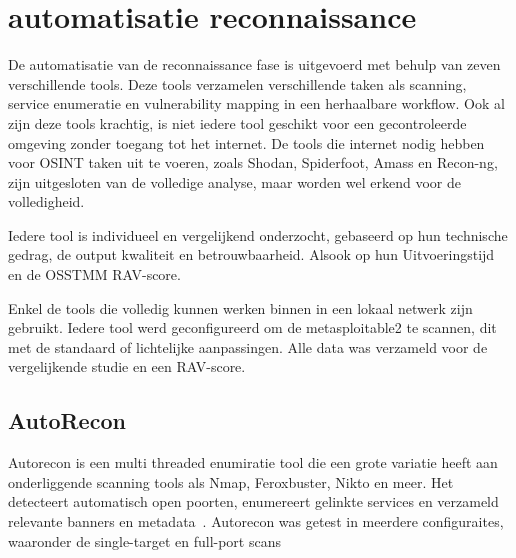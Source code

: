 \section{automatisatie reconnaissance}

De automatisatie van de reconnaissance fase is uitgevoerd met behulp van zeven verschillende tools.
Deze tools verzamelen verschillende taken als scanning, service enumeratie en vulnerability mapping in een herhaalbare workflow.
Ook al zijn deze tools krachtig, is niet iedere tool geschikt voor een gecontroleerde omgeving zonder toegang tot het internet.
De tools die internet nodig hebben voor OSINT taken uit te voeren, zoals Shodan, Spiderfoot, Amass en Recon-ng, zijn uitgesloten van de volledige analyse, maar worden wel erkend voor de volledigheid.

Iedere tool is individueel en vergelijkend onderzocht, gebaseerd op hun technische gedrag, de output kwaliteit en betrouwbaarheid. Alsook op hun Uitvoeringstijd en de OSSTMM RAV-score.

Enkel de tools die volledig kunnen werken binnen in een lokaal netwerk zijn gebruikt.
Iedere tool werd geconfigureerd om de metasploitable2 te scannen, dit met de standaard of lichtelijke aanpassingen.
Alle data was verzameld voor de vergelijkende studie en een RAV-score.

\subsection{AutoRecon}
Autorecon is een multi threaded enumiratie tool die een grote variatie heeft aan onderliggende scanning tools als Nmap, Feroxbuster, Nikto en meer.
Het detecteert automatisch open poorten, enumereert gelinkte services en verzameld relevante banners en metadata~\autocite{AutoRecon}. 
Autorecon was getest in meerdere configuraites, waaronder de single-target en full-port scans 


